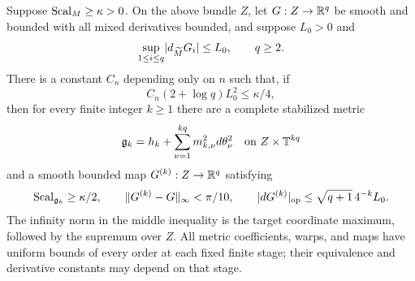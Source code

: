 \begin{theorem}\label{thm:shortening}
Suppose $\operatorname{Scal}_M\ge\kappa>0$. On the above bundle $Z$, let
$G:Z\to\mathbb R^q$ be smooth and bounded with all mixed derivatives bounded, and suppose $L_0>0$ and
\[
 \sup_{1\le i\le q}\lvert d_{\widetilde M}G_i\rvert\le L_0,
 \qquad q\ge2.
\]
There is a constant $C_n$ depending only on $n$ such that, if
\begin{equation}\label{eq:shortening-smallness}
 C_n(2+\log q)L_0^2\le\kappa/4,
\end{equation}
then for every finite integer $k\ge1$ there are a complete stabilized metric
\[
 \mathfrak g_k=h_k+\sum_{\nu=1}^{kq}m_{k,\nu}^2d\theta_\nu^2
 \quad\text{on }Z\times\mathbb T^{kq}
\]
and a smooth bounded map $G^{(k)}:Z\to\mathbb R^q$ satisfying
\begin{equation}\label{eq:shortening-output}
 \operatorname{Scal}_{\mathfrak g_k}\ge\kappa/2,\qquad
 \lVert G^{(k)}-G\rVert_{\infty}<\pi/10,\qquad
 \lvert dG^{(k)}\rvert_{\rm op}\le\sqrt{q+1}\,4^{-k}L_0.
\end{equation}
The infinity norm in the middle inequality is the target coordinate maximum, followed by the supremum over $Z$. All metric coefficients, warps, and maps have uniform bounds of every order at each fixed finite stage; their equivalence and derivative constants may depend on that stage.
\end{theorem}

